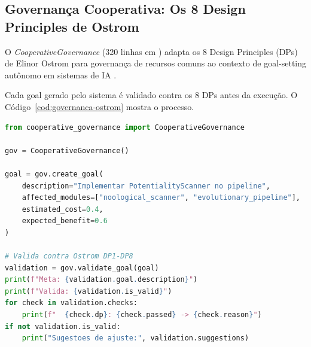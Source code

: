 \subsection{Governança Cooperativa: Os 8 Design Principles de Ostrom}

O \emph{CooperativeGovernance} (320 linhas em
) adapta os 8 Design Principles (DPs) de
Elinor Ostrom para governança de recursos comuns ao contexto de goal-setting
autônomo em sistemas de IA \cite{ostrom1990governing}.

\begin{table}[htb]
\centering
    \small
\caption{Os 8 Design Principles de Ostrom adaptados para governança de IA}
\label{tab:ostrom-dp}
\end{table}

Cada goal gerado pelo sistema é validado contra os 8 DPs antes da execução.
O Código~\ref{cod:governanca-ostrom} mostra o processo.

\begin{lstlisting}[caption={Validacao de goals contra os principios de
Ostrom.},
label={cod:governanca-ostrom}, style=pythonstyle, language=Python]
from cooperative_governance import CooperativeGovernance

gov = CooperativeGovernance()

goal = gov.create_goal(
    description="Implementar PotentialityScanner no pipeline",
    affected_modules=["noological_scanner", "evolutionary_pipeline"],
    estimated_cost=0.4,
    expected_benefit=0.6
)

# Valida contra Ostrom DP1-DP8
validation = gov.validate_goal(goal)
print(f"Meta: {validation.goal.description}")
print(f"Valida: {validation.is_valid}")
for check in validation.checks:
    print(f"  {check.dp}: {check.passed} -> {check.reason}")
if not validation.is_valid:
    print("Sugestoes de ajuste:", validation.suggestions)
\end{lstlisting}

